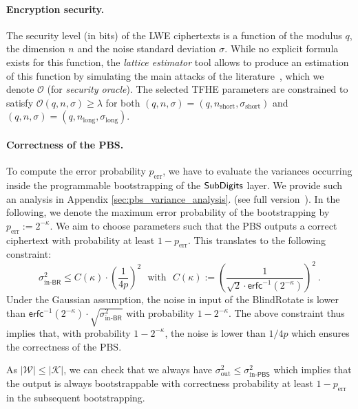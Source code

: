 \paragraph{Encryption security.} 
The security level (in bits) of the LWE ciphertexts is a function of the modulus $q$, the dimension $n$ and the noise standard deviation $\sigma$. While no explicit formula exists for this function, the \emph{lattice estimator} tool allows to produce an estimation of this function by simulating the main attacks of the literature~\cite{lattice-estimator}, which we denote $\mathcal{O}$ (for \emph{security oracle}). The selected TFHE parameters are constrained to satisfy $\mathcal{O}(q,n,\sigma) \geq \lambda$ for both $(q,n,\sigma) = (q,n_{\text{short}},\sigma_{\text{short}})$ and $(q,n,\sigma) = (q,n_{\text{long}},\sigma_{\text{long}})$.



\paragraph{Correctness of the PBS.} To compute the error probability $p_{\text{err}}$, we have to evaluate the variances occurring inside the programmable bootstrapping of the $\text{\textsf{SubDigits}}$ layer\ifeprint. We provide such an analysis in Appendix \ref{sec:pbs_variance_analysis}. \else (see full version~\cite{EPRINT:BBBBCL25}).\fi
{}
In the following, we denote the maximum error probability of the bootstrapping by $p_{\text{err}} := 2^{-\kappa}$. We aim to choose parameters such that the PBS outputs a correct ciphertext with probability at least $1-p_{\text{err}}$. This translates to the following constraint:
$$\sigma^2_{\text{in-}\textsf{BR}} \leq  C(\kappa) \cdot \left(\frac1{4p}\right)^2 ~~~\text{with}~~~C(\kappa) := \left(\frac{1}{\sqrt{2} \cdot \mathsf{erfc}^{-1}(2^{-\kappa})}\right)^2 ~.$$
Under the Gaussian assumption, the noise in input of the \textsf{BlindRotate} is lower than $\mathsf{erfc}^{-1}(2^{-\kappa}) \cdot \sqrt{\sigma^2_{\text{in-}\textsf{BR}}}$ with probability $1-2^{-\kappa}$. The above constraint thus implies that, with probability $1-2^{-\kappa}$, the noise is lower than $1/{4p}$ which ensures the correctness of the PBS. 

As $|\mathcal W| \leq |\mathcal K|$, we can check that we always have $\sigma^2_{\text{out}} \leq \sigma^2_{\text{in-}\textsf{PBS}}$ which implies that the output is always bootstrappable with correctness probability at least $1-p_{\text{err}}$ in the subsequent bootstrapping.


